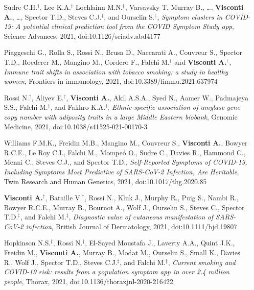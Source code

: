 \documentclass[a4paper,10pt]{article}
\begin{document}
{\begin{itemize}
		 Sudre C.H.$^{\textbf{$\dag $}}$, Lee K.A.$^{\textbf{$\dag $}}$ Lochlainn M.N.$^{\textbf{$\dag $}}$, Varsavsky T, Murray B., \dots, \textbf{Visconti A.}, \dots, Spector T.D., Steves C.J.$^{\textbf{$\ddag $}}$, and Ourselin S.$^{\textbf{$\ddag $}}$, \emph{Symptom clusters in COVID-19: A potential clinical prediction tool from the COVID Symptom Study app}, Science Advances, 2021, doi:10.1126/sciadv.abd4177

	    Piaggeschi G., Rolla S., Rossi N., Brusa D., Naccarati A., Couvreur S., Spector T.D., Roederer M., Mangino M., Cordero F., Falchi M.$^{\textbf{$\ddag $}}$ and \textbf{Visconti A.}$^{\textbf{$\ddag $}}$, \emph{Immune trait shifts in association with tobacco smoking: a study in healthy women}, Frontiers in immunology, 2021, doi:10.3389/fimmu.2021.637974

	    Rossi N.$^{\textbf{$\dag $}}$, Aliyev E.$^{\textbf{$\dag $}}$, \textbf{Visconti A.}, Akil A.S.A., Syed N., Aamer W., Padmajeya S.S., Falchi M.$^{\textbf{$\ddag $}}$, and Fakhro K.A.$^{\textbf{$\ddag $}}$, \emph{Ethnic-specific association of amylase gene copy number with adiposity traits in a large Middle Eastern biobank}, Genomic Medicine, 2021, doi:10.1038/s41525-021-00170-3

	   	Williams F.M.K., Freidin M.B., Mangino M., Couvreur S., \textbf{Visconti A.}, Bowyer R.C.E., Le Roy C.I., Falchi M., Mompe\'o O., Sudre C., Davies R., Hammond C., Menni C., Steves C.J., and Spector T.D., \emph{Self-Reported Symptoms of COVID-19, Including Symptoms Most Predictive of SARS-CoV-2 Infection, Are Heritable}, Twin Research and Human Genetics, 2021, doi:10.1017/thg.2020.85

	    \textbf{Visconti A.}$^{\textbf{$\dag $}}$, Bataille V.$^{\textbf{$\dag $}}$, Rossi N., Kluk J., Murphy R., Puig S., Nambi R., Bowyer R.C.E., Murray B., Bournot A., Wolf J., Ourselin S., Steves C., Spector T.D.$^{\textbf{$\ddag $}}$, and Falchi M.$^{\textbf{$\ddag $}}$, \emph{Diagnostic value of cutaneous manifestation of SARS-CoV-2 infection}, British Journal of Dermatology, 2021, doi:10.1111/bjd.19807

		 Hopkinson N.S.$^{\textbf{$\dag $}}$, Rossi N.$^{\textbf{$\dag $}}$, El-Sayed Moustafa J., Laverty A.A., Quint J.K., Freidin M., \textbf{Visconti A.}, Murray B., Modat M., Ourselin S., Small K., Davies R., Wolf J., Spector T.D., Steves C.J.$^{\textbf{$\ddag $}}$, and Falchi M.$^{\textbf{$\ddag $}}$, \emph{Current smoking and COVID-19 risk: results from a population symptom app in over 2.4 million people}, Thorax, 2021, doi:10.1136/thoraxjnl-2020-216422


\end{itemize}}
\end{document}
